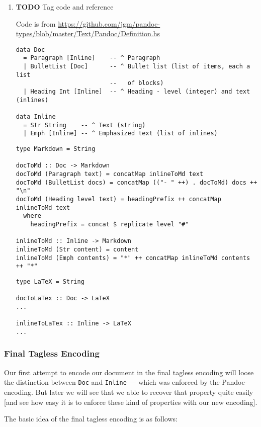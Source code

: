 \documentclass[11pt]{article}
\begin{document}
\begin{enumerate}
\item {\bfseries\sffamily TODO} Tag code and reference
\label{sec:org6eb6f22}

Code is from
\url{https://github.com/jgm/pandoc-types/blob/master/Text/Pandoc/Definition.hs}
\begin{verbatim}
data Doc
  = Paragraph [Inline]    -- ^ Paragraph
  | BulletList [Doc]      -- ^ Bullet list (list of items, each a list
                          --   of blocks)
  | Heading Int [Inline]  -- ^ Heading - level (integer) and text (inlines)

data Inline
  = Str String    -- ^ Text (string)
  | Emph [Inline] -- ^ Emphasized text (list of inlines)
\end{verbatim}

\begin{verbatim}
type Markdown = String

docToMd :: Doc -> Markdown
docToMd (Paragraph text) = concatMap inlineToMd text
docToMd (BulletList docs) = concatMap (("- " ++) . docToMd) docs ++ "\n"
docToMd (Heading level text) = headingPrefix ++ concatMap inlineToMd text
  where
    headingPrefix = concat $ replicate level "#"

inlineToMd :: Inline -> Markdown
inlineToMd (Str content) = content
inlineToMd (Emph contents) = "*" ++ concatMap inlineToMd contents ++ "*"
\end{verbatim}

\begin{verbatim}
type LaTeX = String

docToLaTex :: Doc -> LaTeX
...

inlineToLaTex :: Inline -> LaTeX
...
\end{verbatim}
\end{enumerate}

\subsubsection{Final Tagless Encoding}
\label{sec:orgefd6382}

Our first attempt to encode our document in the final tagless encoding will
loose the distinction between \texttt{Doc} and \texttt{Inline} — which was enforced by the
Pandoc-encoding. But later we will see that we able to recover that property
quite easily [and see how easy it is to enforce these kind of properties with
our new encoding].

The basic idea of the final tagless encoding is as follows:
\end{document}
